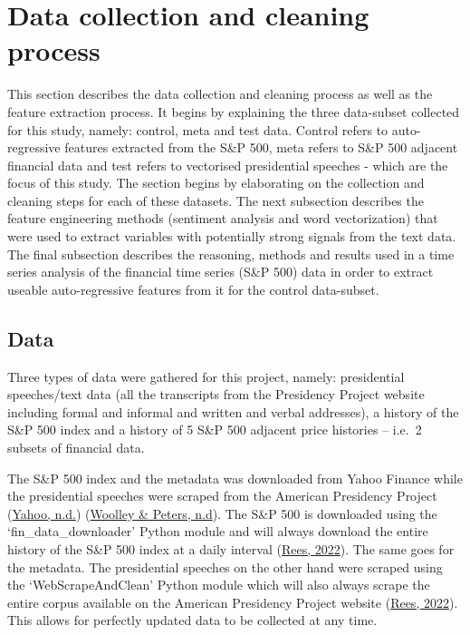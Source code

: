 \documentclass[11pt,preprint, authoryear]{elsarticle}
\numberwithin{equation}{section}
\numberwithin{figure}{section}
\numberwithin{table}{section}
\begin{document}
\hypertarget{data-collection-and-cleaning-process}{%
\section{Data collection and cleaning
process}\label{data-collection-and-cleaning-process}}

This section describes the data collection and cleaning process as well
as the feature extraction process. It begins by explaining the three
data-subset collected for this study, namely: control, meta and test
data. Control refers to auto-regressive features extracted from the S\&P
500, meta refers to S\&P 500 adjacent financial data and test refers to
vectorised presidential speeches - which are the focus of this study.
The section begins by elaborating on the collection and cleaning steps
for each of these datasets. The next subsection describes the feature
engineering methods (sentiment analysis and word vectorization) that
were used to extract variables with potentially strong signals from the
text data. The final subsection describes the reasoning, methods and
results used in a time series analysis of the financial time series
(S\&P 500) data in order to extract useable auto-regressive features
from it for the control data-subset.

\hypertarget{data}{%
\subsection{Data}\label{data}}

Three types of data were gathered for this project, namely: presidential
speeches/text data (all the transcripts from the Presidency Project
website including formal and informal and written and verbal addresses),
a history of the S\&P 500 index and a history of 5 S\&P 500 adjacent
price histories -- i.e.~2 subsets of financial data.

The S\&P 500 index and the metadata was downloaded from Yahoo Finance
while the presidential speeches were scraped from the American
Presidency Project (\protect\hyperlink{ref-yahooSP500}{Yahoo, n.d.})
(\protect\hyperlink{ref-americanPresProj1}{Woolley \& Peters, n.d}). The
S\&P 500 is downloaded using the `fin\_data\_downloader' Python module
and will always download the entire history of the S\&P 500 index at a
daily interval (\protect\hyperlink{ref-rees2022mastersgithub}{Rees,
2022}). The same goes for the metadata. The presidential speeches on the
other hand were scraped using the `WebScrapeAndClean' Python module
which will also always scrape the entire corpus available on the
American Presidency Project website
(\protect\hyperlink{ref-rees2022mastersgithub}{Rees, 2022}). This allows
for perfectly updated data to be collected at any time.
\end{document}
